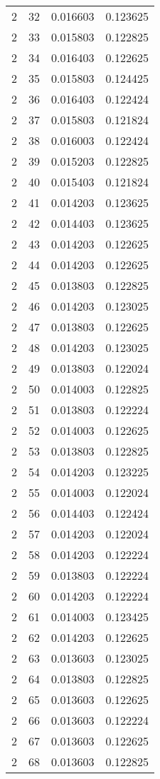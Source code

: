 \begin{longtable}{rrrr}
2 & 32 & 0.016603 & 0.123625 \\
2 & 33 & 0.015803 & 0.122825 \\
2 & 34 & 0.016403 & 0.122625 \\
2 & 35 & 0.015803 & 0.124425 \\
2 & 36 & 0.016403 & 0.122424 \\
2 & 37 & 0.015803 & 0.121824 \\
2 & 38 & 0.016003 & 0.122424 \\
2 & 39 & 0.015203 & 0.122825 \\
2 & 40 & 0.015403 & 0.121824 \\
2 & 41 & 0.014203 & 0.123625 \\
2 & 42 & 0.014403 & 0.123625 \\
2 & 43 & 0.014203 & 0.122625 \\
2 & 44 & 0.014203 & 0.122625 \\
2 & 45 & 0.013803 & 0.122825 \\
2 & 46 & 0.014203 & 0.123025 \\
2 & 47 & 0.013803 & 0.122625 \\
2 & 48 & 0.014203 & 0.123025 \\
2 & 49 & 0.013803 & 0.122024 \\
2 & 50 & 0.014003 & 0.122825 \\
2 & 51 & 0.013803 & 0.122224 \\
2 & 52 & 0.014003 & 0.122625 \\
2 & 53 & 0.013803 & 0.122825 \\
2 & 54 & 0.014203 & 0.123225 \\
2 & 55 & 0.014003 & 0.122024 \\
2 & 56 & 0.014403 & 0.122424 \\
2 & 57 & 0.014203 & 0.122024 \\
2 & 58 & 0.014203 & 0.122224 \\
2 & 59 & 0.013803 & 0.122224 \\
2 & 60 & 0.014203 & 0.122224 \\
2 & 61 & 0.014003 & 0.123425 \\
2 & 62 & 0.014203 & 0.122625 \\
2 & 63 & 0.013603 & 0.123025 \\
2 & 64 & 0.013803 & 0.122825 \\
2 & 65 & 0.013603 & 0.122625 \\
2 & 66 & 0.013603 & 0.122224 \\
2 & 67 & 0.013603 & 0.122625 \\
2 & 68 & 0.013603 & 0.122825 \\

\end{longtable}
